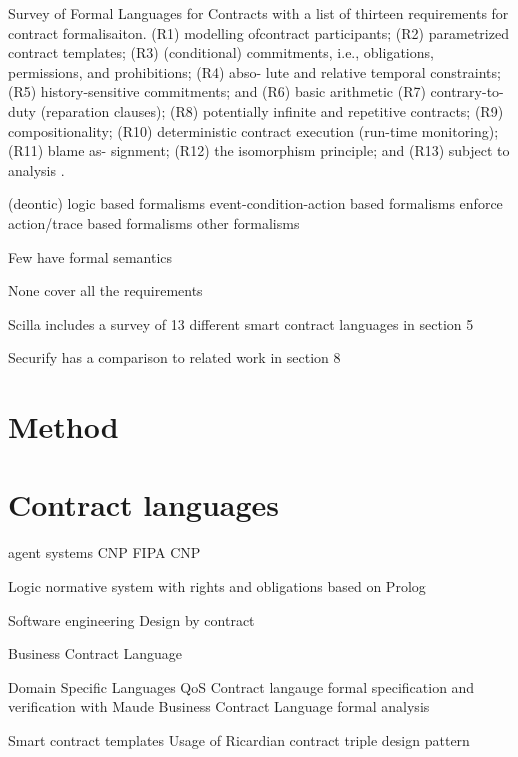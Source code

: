 \documentclass{article}
\begin{document}
Survey of Formal Languages for Contracts with a list of thirteen requirements for contract formalisaiton.
(R1) modelling ofcontract participants; (R2) parametrized contract templates; (R3) (conditional) commitments, i.e., obligations, permissions, and prohibitions; (R4) abso- lute and relative temporal constraints; (R5) history-sensitive commitments; and (R6) basic arithmetic
(R7) contrary-to-duty (reparation clauses); (R8) potentially infinite and repetitive contracts; (R9) compositionality; (R10) deterministic contract execution (run-time monitoring); (R11) blame as- signment; (R12) the isomorphism principle; and (R13) subject to analysis
 \cite{Hvitved2010}.
 
(deontic) logic based formalisms
event-condition-action based formalisms enforce
action/trace based formalisms
other formalisms

Few have formal semantics \cite{Andersen2006} \cite{Kyas2008} \cite{Xu2004}

None cover all the requirements


Scilla includes a survey of 13 different smart contract languages in section 5 \cite{Sergey2018}

Securify has a comparison to related work in section 8 \cite{Tsankov2017}



\section{Method}



\section{Contract languages}

agent systems
CNP \cite{Smith1980}
FIPA CNP \cite{FIPA2002}

Logic
normative system with rights and obligations based on Prolog \cite{Michael2010}


Software engineering
Design by contract \cite{Meyer1992}

Business Contract Language \cite{Neal.2003}

Domain Specific Languages
QoS Contract langauge formal specification and verification with Maude \cite{Braga2009}
Business Contract Language formal analysis \cite{Governatori2006}


Smart contract templates
Usage of Ricardian contract triple design pattern \cite{Clack2016}
\end{document}
